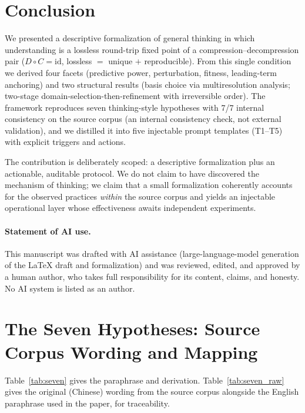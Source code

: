 \documentclass[11pt]{article}
\newcommand{\Cmap}{C}
\newcommand{\Dmap}{D}
\begin{document}
\section{Conclusion}
\label{sec:conclusion}

We presented a descriptive formalization of general thinking in which
understanding is a lossless round-trip fixed point of a compression--decompression
pair ($\Dmap\circ\Cmap=\mathrm{id}$, lossless $=$ unique $+$ reproducible). From
this single condition we derived four facets (predictive power, perturbation,
fitness, leading-term anchoring) and two structural results (basis choice via
multiresolution analysis; two-stage domain-selection-then-refinement with
irreversible order). The framework reproduces seven thinking-style hypotheses
with 7/7 internal consistency on the source corpus (an internal consistency
check, not external validation), and we distilled it into five injectable prompt
templates (T1--T5) with explicit triggers and actions.

The contribution is deliberately scoped: a descriptive formalization plus an
actionable, auditable protocol. We do not claim to have discovered the mechanism
of thinking; we claim that a small formalization coherently accounts for the
observed practices \emph{within} the source corpus and yields an injectable
operational layer whose effectiveness awaits independent experiments.

\paragraph{Statement of AI use.}
This manuscript was drafted with AI assistance (large-language-model generation
of the LaTeX draft and formalization) and was reviewed, edited, and approved by
a human author, who takes full responsibility for its content, claims, and
honesty. No AI system is listed as an author.
\appendix
\section{The Seven Hypotheses: Source Corpus Wording and Mapping}
\label{app:hypotheses}

Table~\ref{tab:seven} gives the paraphrase and derivation. Table~\ref{tab:seven_raw}
gives the original (Chinese) wording from the source corpus alongside the
English paraphrase used in the paper, for traceability.
\end{document}
